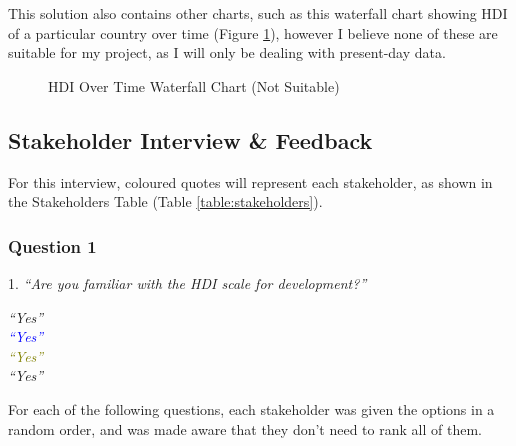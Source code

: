 \documentclass[12pt]{report}
\begin{document}
This solution also contains other charts, such as this waterfall chart showing HDI of a particular country over time (Figure \ref{fig:es3c}), however I believe none of these are suitable for my project, as I will only be dealing with present-day data.
\begin{figure}[H]
\centering
{}
\caption{HDI Over Time Waterfall Chart (Not Suitable)}\label{fig:es3c}
\end{figure}

\subsection{Stakeholder Interview \& Feedback}\label{sec:stakeholderinterview}
For this interview, coloured quotes will represent each stakeholder, as shown in the Stakeholders Table (Table \ref{table:stakeholders}).

\subsubsection{Question 1}
1. \textit{``Are you familiar with the HDI scale for development?''}
\begin{flushright}
\textit{\textcolor{Sepia}{``Yes''}} \\
\textit{\textcolor{Blue}{``Yes''}} \\
\textit{\textcolor{olive}{``Yes''}} \\
\textit{\textcolor{OliveGreen}{``Yes''}}
\end{flushright}
For each of the following questions, each stakeholder was given the options in a random order, and was made aware that they don't need to rank all of them.
\end{document}
